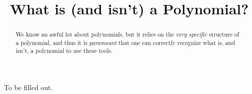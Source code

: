 \documentclass{ximeraXloud}
\title{What is (and isn't) a Polynomial?}
\begin{document}
\begin{abstract}
    We know an awful lot about polynomials, but it relies on the \textit{very specific} structure of a polynomial, and thus it is \textit{paramount} that one can correctly recognize what is, and isn't, a polynomial to use these tools.
\end{abstract}
\maketitle
To be filled out.

\end{document}
